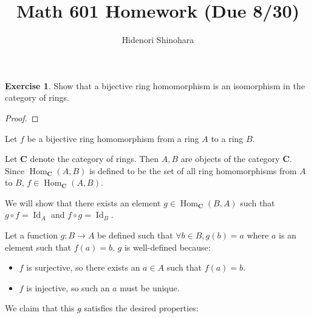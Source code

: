 \documentclass[12pt, psamsfonts]{amsart}
\theoremstyle{definition}
\newtheorem{exer}[thm]{Exercise}
\theoremstyle{remark}
\DeclareMathOperator{\Hom}{Hom}
\DeclareMathOperator{\Id}{Id}
\numberwithin{equation}{section}
\begin{document}
\title{Math 601 Homework (Due 8/30)}
\author{Hidenori Shinohara}
\maketitle

\begin{exer}
  Show that a bijective ring homomorphism is an isomorphism in the category of rings.
\end{exer}

\begin{proof}
\end{proof}
Let $f$ be a bijective ring homomorphism from a ring $A$ to a ring $B$.

Let $\mathbf{C}$ denote the category of rings.
Then $A, B$ are objects of the category $\mathbf{C}$.
Since $\Hom_{\mathbf{C}}(A, B)$ is defined to be the set of all ring homomorphisms from $A$ to $B$, $f \in \Hom_{\mathbf{C}}(A, B)$.

We will show that there exists an element $g \in \Hom_{\mathbf{C}}(B, A)$ such that $g \circ f = \Id_A$ and $f \circ g = \Id_B$.

Let a function $g: B \rightarrow A$ be defined such that $\forall b \in B, g(b) = a$ where $a$ is an element such that $f(a) = b$.
$g$ is well-defined because:

\begin{itemize}
  \item
    $f$ is surjective, so there exists an $a \in A$ such that $f(a) = b$.
  \item
    $f$ is injective, so such an $a$ must be unique.
\end{itemize}

We claim that this $g$ satisfies the desired properties:
\end{document}
